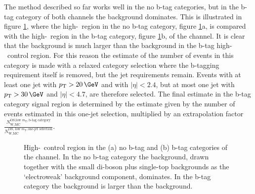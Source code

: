 The method described so far works well in the no b-tag categories, but in the b-tag category of both channels
the \ttbar background dominates. This is illustrated in figure \ref{fig:bkgs_highmtctrl}, where
the high-\mT~region in the no b-tag category, figure \ref{fig:bkgs_highmtctrl}a, is compared with the high-\mT~region in the 
b-tag category, figure \ref{fig:bkgs_highmtctrl}b, of the \etau channel. It is clear that the \ttbar 
background is much larger than the \Wjets background in the b-tag high-\mT~control region.
For this reason the estimate of the number
of \Wjets events in this category is made with a relaxed category selection where the b-tagging
requirement itself is removed, but the jet requirements remain. Events with at least one 
jet with $\pTm>20\,\GeV$ and with $|\eta|<2.4$, but at most one jet with $\pTm>30\,\GeV$ and $|\eta|<4.7$, are therefore selected. The final \Wjets estimate in the b-tag category signal
region is determined by the estimate given by the number of \Wjets events
estimated in this one-jet selection, multiplied by an extrapolation factor 
$\frac{N_{\text{W,MC}}^{\text{OS,low } m_{\text{T}},\text{b-tag category}}}{N_{\text{W,MC}}^{\text{OS, low }m_{\text{T}},\text{one-jet selection}}}$.
\begin{figure}[h!]
\begin{center}
\end{center}
\caption[High-\mT~control region in the no b-tag and b-tag
categories of the \etau channel.]{High-\mT~control region in the (a) no b-tag and (b) b-tag categories of the \etau
channel. In the no b-tag category the \Wjets background, drawn together with the small
 di-boson plus single-top backgrounds as the `electroweak' background component, dominates. In the b-tag
category the \ttbar background is larger than the \Wjets background.}
\label{fig:bkgs_highmtctrl}
\end{figure}

